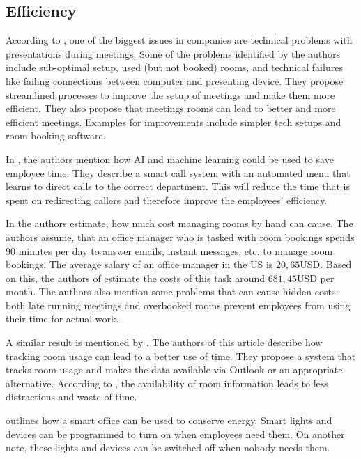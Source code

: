 \subsection{Efficiency}




According to \cite{roomzilla3}, one of the biggest issues in companies are technical problems with presentations during meetings. Some of the problems identified by the authors include sub-optimal setup, used (but not booked) rooms, and technical failures like failing connections between computer and presenting device. They propose streamlined processes to improve the setup of meetings and make them more efficient. They also propose that meetings rooms can lead to better and more efficient meetings. Examples for improvements include simpler tech setups and room booking software.

In \cite{hbcommunications}, the authors mention how AI and machine learning could be used to save employee time. They describe a smart call system with an automated menu that learns to direct calls to the correct department. This will reduce the time that is spent on redirecting callers and therefore improve the employees' efficiency. 

In \cite{roomzilla9} the authors estimate, how much cost managing rooms by hand can cause. The authors assume, that an office manager who is tasked with room bookings spends 90 minutes per day to answer emails, instant messages, etc. to manage room bookings. The average salary of an office manager in the US is \(20,65\text{USD}\). Based on this, the authors of \cite{roomzilla9} estimate the costs of this task around \(681,45\text{USD}\) per month. The authors also mention some problems that can cause hidden costs: both late running meetings and overbooked rooms prevent employees from using their time for actual work. 

A similar result is mentioned by \cite{iotagenda}. The authors of this article describe how tracking room usage can lead to a better use of time. They propose a system that tracks room usage and makes the data available via Outlook or an appropriate alternative. According to \cite{iotagenda}, the availability of room information leads to less distractions and waste of time. 




\cite{hbcommunications} outlines how a smart office can be used to conserve energy. Smart lights and devices can be programmed to turn on when employees need them. On another note, these lights and devices can be switched off when nobody needs them.




